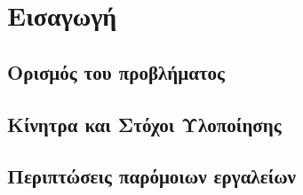 \chapter{Εισαγωγή}
\section{Ορισμός του προβλήματος}

\section{Κίνητρα και Στόχοι Υλοποίησης}

\section{Περιπτώσεις παρόμοιων εργαλείων}
